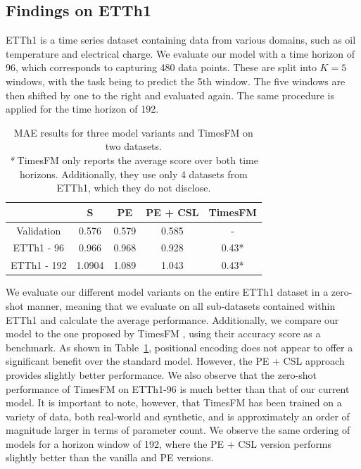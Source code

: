 \documentclass{article}
\theoremstyle{plain}
\theoremstyle{definition}
\theoremstyle{remark}
\begin{document}
\subsection{Findings on ETTh1}
ETTh1 is a time series dataset containing data from various domains, such as oil temperature and electrical charge. We evaluate our model with a time horizon of 96, which corresponds to capturing 480 data points. These are split into $K=5$ windows, with the task being to predict the 5th window. 
The five windows are then shifted by one to the right and evaluated again.
The same procedure is applied for the time horizon of 192.
\begin{table}[h!]
    \centering
    \begin{tabular}{|c|c|c|c|c|}
    \hline
    \textbf{} & S & PE & PE + CSL & TimesFM \\ \hline 
    Validation   & 0.576             & 0.579             & 0.585             & -       \\ \hline
    ETTh1 - 96   & 0.966             & 0.968            & 0.928      &0.43*             \\ \hline
    ETTh1 - 192  & 1.0904            & 1.089            & 1.043            & 0.43*                     \\ \hline

\end{tabular}
    \caption{MAE results for three model variants and TimesFM on two datasets.\\
    \textit{*} TimesFM \cite{} only reports the average score over both time horizons. Additionally, they use only 4 datasets from ETTh1, which they do not disclose.
    }
    \label{tab:evaluation_results}
\end{table}
We evaluate our different model variants on the entire ETTh1 dataset in a zero-shot manner, meaning that we evaluate on all sub-datasets contained within ETTh1 and calculate the average performance.
Additionally, we compare our model to the one proposed by TimesFM \cite{}, using their accuracy score as a benchmark.
As shown in Table~\ref{tab:evaluation_results}, positional encoding does not appear to offer a significant benefit over the standard model. However, the PE + CSL approach provides slightly better performance. We also observe that the zero-shot performance of TimesFM on ETTh1-96 is much better than that of our current model. It is important to note, however, that TimesFM has been trained on a variety of data, both real-world and synthetic, and is approximately an order of magnitude larger in terms of parameter count.
We observe the same ordering of models for a horizon window of 192, where the PE + CSL version performs slightly better than the vanilla and PE versions.
\end{document}
